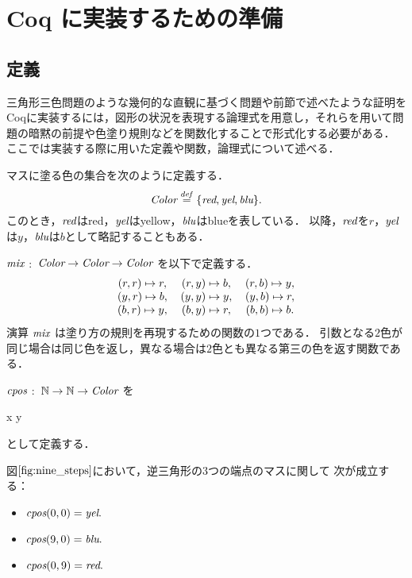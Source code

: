 \section{ Coq に実装するための準備}
\subsection{定義}
三角形三色問題のような幾何的な直観に基づく問題や前節で述べたような証明をCoqに実装するには，図形の状況を表現する論理式を用意し，それらを用いて問題の暗黙の前提や色塗り規則などを関数化することで形式化する必要がある．
ここでは実装する際に用いた定義や関数，論理式について述べる．
\begin{dfn}[$\Color$]
  マスに塗る色の集合を次のように定義する．
  \[
  \textit{Color} \overset{{\it def}}{=} \{\textit{red}, \textit{yel}, \textit{blu}\}.
  \]
  このとき，$\textit{red}$は{\rm{red}}，$\textit{yel}$は{\rm{yellow}}，$\textit{blu}$は{\rm{blue}}を表している．
  以降，$\textit{red}$を$r$，$\textit{yel}$は$y$，$\textit{blu}$は$b$として略記することもある．
\end{dfn}
\begin{dfn}[$\mix$]
  $\mix$ $:$ $\textit{Color} \to \textit{Color} \to \textit{Color}$ を以下で定義する．
  \[
  \begin{tabular}{ccccc}
    $(r,r) \Pto r,$ & $(r,y) \Pto b,$ & $(r,b) \Pto y,$ \\
    $(y,r) \Pto b,$ & $(y,y) \Pto y,$ & $(y,b) \Pto r,$ \\
    $(b,r) \Pto y,$ & $(b,y) \Pto r,$ & $(b,b) \Pto b.$ \\
  \end{tabular}
  \]
  演算 $\mix$ は塗り方の規則を再現するための関数の$1$つである．
  引数となる$2$色が同じ場合は同じ色を返し，異なる場合は$2$色とも異なる第三の色を返す関数である．
\end{dfn}
\begin{dfn}[$\cpos$]
  $\cpos$ $:$ $\mathbb{N} \to \mathbb{N} \to \textit{Color}$ を
  \begin{center}
   x  y 
  \end{center}
  として定義する．
\end{dfn}
\begin{exm}
  図$\ref{fig:nine_steps}$において，逆三角形の$3$つの端点のマスに関して
  次が成立する：
  \begin{itemize}
    \item $\textit{cpos}(0,0) = \textit{yel}.$
    \item $\textit{cpos}(9,0) = \textit{blu}.$
    \item $\textit{cpos}(0,9) = \textit{red}.$
  \end{itemize}
\end{exm}
